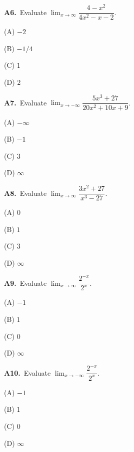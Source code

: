 \documentclass[11pt]{article}
\begin{document}
\bigskip\noindent\textbf{A6.}\ Evaluate $\displaystyle\lim_{x\to \infty}\dfrac{4-x^2}{4x^2-x-2}$.
\begin{list}{}{\setlength{\leftmargin}{3em}\setlength{\labelwidth}{2.5em}\setlength{\itemsep}{0pt}\setlength{\topsep}{2pt}}
\item[(A)] $-2$
\item[(B)] $-1/4$
\item[(C)] $1$
\item[(D)] $2$
\end{list}

\bigskip\noindent\textbf{A7.}\ Evaluate $\displaystyle\lim_{x\to -\infty}\dfrac{5x^3+27}{20x^2+10x+9}$.
\begin{list}{}{\setlength{\leftmargin}{3em}\setlength{\labelwidth}{2.5em}\setlength{\itemsep}{0pt}\setlength{\topsep}{2pt}}
\item[(A)] $-\infty$
\item[(B)] $-1$
\item[(C)] $3$
\item[(D)] $\infty$
\end{list}

\bigskip\noindent\textbf{A8.}\ Evaluate $\displaystyle\lim_{x\to \infty}\dfrac{3x^2+27}{x^3-27}$.
\begin{list}{}{\setlength{\leftmargin}{3em}\setlength{\labelwidth}{2.5em}\setlength{\itemsep}{0pt}\setlength{\topsep}{2pt}}
\item[(A)] $0$
\item[(B)] $1$
\item[(C)] $3$
\item[(D)] $\infty$
\end{list}

\bigskip\noindent\textbf{A9.}\ Evaluate $\displaystyle\lim_{x\to \infty}\dfrac{2^{-x}}{2^x}$.
\begin{list}{}{\setlength{\leftmargin}{3em}\setlength{\labelwidth}{2.5em}\setlength{\itemsep}{0pt}\setlength{\topsep}{2pt}}
\item[(A)] $-1$
\item[(B)] $1$
\item[(C)] $0$
\item[(D)] $\infty$
\end{list}

\bigskip\noindent\textbf{A10.}\ Evaluate $\displaystyle\lim_{x\to -\infty}\dfrac{2^{-x}}{2^x}$.
\begin{list}{}{\setlength{\leftmargin}{3em}\setlength{\labelwidth}{2.5em}\setlength{\itemsep}{0pt}\setlength{\topsep}{2pt}}
\item[(A)] $-1$
\item[(B)] $1$
\item[(C)] $0$
\item[(D)] $\infty$
\end{list}
\end{document}
